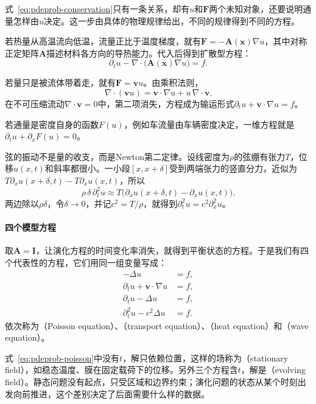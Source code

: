 式~\eqref{eq:pdeprob-conservation}只有一条关系，却有$u$和$\bm{F}$两个未知对象，还要说明通量怎样由$u$决定。这一步由具体的物理规律给出，不同的规律得到不同的方程。

若热量从高温流向低温，流量正比于温度梯度，就有$\bm{F}=-\bm{A}(\bm{x})\nabla u$，其中对称正定矩阵$\bm{A}$描述材料各方向的导热能力。代入后得到扩散型方程：
\begin{equation}
  \partial_tu-\nabla\cdot\bigl(\bm{A}(\bm{x})\nabla u\bigr)=f.
  \label{eq:pdeprob-diffusion-general}
\end{equation}

若量只是被流体带着走，就有$\bm{F}=\bm{v}u$。由乘积法则，
\[
  \nabla\cdot(\bm{v}u)=\bm{v}\cdot\nabla u+u\,\nabla\cdot\bm{v}.
\]
在不可压缩流动$\nabla\cdot\bm{v}=0$中，第二项消失，方程成为输运形式$\partial_tu+\bm{v}\cdot\nabla u=f$。

若通量是密度自身的函数$F(u)$，例如车流量由车辆密度决定，一维方程就是$\partial_tu+\partial_xF(u)=0$。

弦的振动不是量的收支，而是Newton第二定律。设线密度为$\rho$的弦绷有张力$T$，位移$u(x,t)$和斜率都很小。一小段$[x,x+\delta]$受到两端张力的竖直分力，近似为$T\partial_xu(x+\delta,t)-T\partial_xu(x,t)$，所以
\[
  \rho\,\delta\,\partial_t^{2}u\approx T\bigl(\partial_xu(x+\delta,t)-\partial_xu(x,t)\bigr).
\]
两边除以$\rho\delta$，令$\delta\to0$，并记$c^{2}=T/\rho$，就得到$\partial_t^{2}u=c^{2}\partial_x^{2}u$。

\paragraph{四个模型方程}
取$\bm{A}=\bm{I}$，让演化方程的时间变化率消失，就得到平衡状态的方程。于是我们有四个代表性的方程，它们用同一组变量写成：
\begin{align}
  -\Delta u&=f, \label{eq:pdeprob-poisson}\\
  \partial_tu+\bm{v}\cdot\nabla u&=f, \label{eq:pdeprob-transport}\\
  \partial_tu-\Delta u&=f, \label{eq:pdeprob-heat}\\
  \partial_t^{2}u-c^{2}\Delta u&=f. \label{eq:pdeprob-wave}
\end{align}
依次称为（Poisson equation）、（transport equation）、（heat equation）和（wave equation）。

式~\eqref{eq:pdeprob-poisson}中没有$t$，解只依赖位置，这样的场称为（stationary field），如稳态温度、膜在固定载荷下的位移。另外三个方程含$t$，解是（evolving field）。静态问题没有起点，只受区域和边界约束；演化问题的状态从某个时刻出发向前推进，这个差别决定了后面需要什么样的数据。

